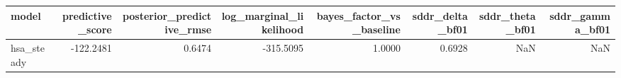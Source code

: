 \begin{tabular}{lrrrrrrr}
\toprule
model & predictive\_score & posterior\_predictive\_rmse & log\_marginal\_likelihood & bayes\_factor\_vs\_baseline & sddr\_delta\_bf01 & sddr\_theta\_bf01 & sddr\_gamma\_bf01 \\
\midrule
hsa\_steady & -122.2481 & 0.6474 & -315.5095 & 1.0000 & 0.6928 & NaN & NaN \\
\bottomrule
\end{tabular}
